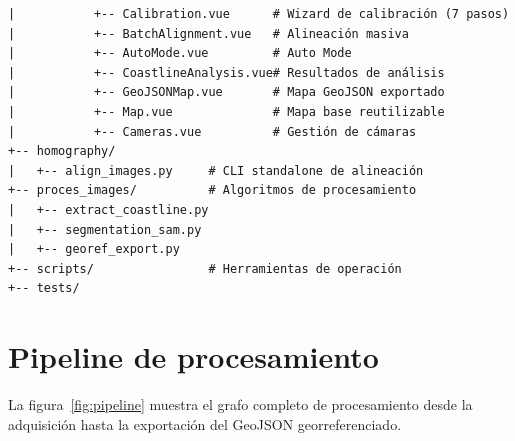 \begin{codebox}
\begin{verbatim}
|           +-- Calibration.vue      # Wizard de calibración (7 pasos)
|           +-- BatchAlignment.vue   # Alineación masiva
|           +-- AutoMode.vue         # Auto Mode
|           +-- CoastlineAnalysis.vue# Resultados de análisis
|           +-- GeoJSONMap.vue       # Mapa GeoJSON exportado
|           +-- Map.vue              # Mapa base reutilizable
|           +-- Cameras.vue          # Gestión de cámaras
+-- homography/
|   +-- align_images.py     # CLI standalone de alineación
+-- proces_images/          # Algoritmos de procesamiento
|   +-- extract_coastline.py
|   +-- segmentation_sam.py
|   +-- georef_export.py
+-- scripts/                # Herramientas de operación
+-- tests/
\end{verbatim}
\end{codebox}

\section{Pipeline de procesamiento}

La figura~\ref{fig:pipeline} muestra el grafo completo de procesamiento desde la adquisición
hasta la exportación del GeoJSON georreferenciado.

